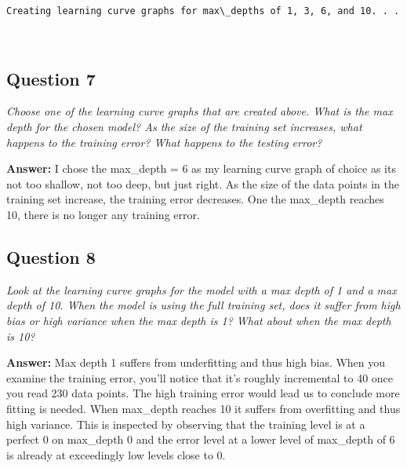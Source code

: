 \documentclass{article}
\begin{document}
    \begin{Verbatim}[commandchars=\\\{\}]
Creating learning curve graphs for max\_depths of 1, 3, 6, and 10. . .
    \end{Verbatim}

    \begin{center}
    \end{center}
    { \hspace*{\fill} \\}
    
    \subsection{Question 7}\label{question-7}

\emph{Choose one of the learning curve graphs that are created above.
What is the max depth for the chosen model? As the size of the training
set increases, what happens to the training error? What happens to the
testing error?}

    \textbf{Answer: } I chose the max\_depth = 6 as my learning curve graph
of choice as its not too shallow, not too deep, but just right. As the
size of the data points in the training set increase, the training error
decreases. One the max\_depth reaches 10, there is no longer any
training error.

    \subsection{Question 8}\label{question-8}

\emph{Look at the learning curve graphs for the model with a max depth
of 1 and a max depth of 10. When the model is using the full training
set, does it suffer from high bias or high variance when the max depth
is 1? What about when the max depth is 10?}

    \textbf{Answer: } Max depth 1 suffers from underfitting and thus high
bias. When you examine the training error, you'll notice that it's
roughly incremental to 40 once you read 230 data points. The high
training error would lead us to conclude more fitting is needed. When
max\_depth reaches 10 it suffers from overfitting and thus high
variance. This is inspected by observing that the training level is at a
perfect 0 on max\_depth 0 and the error level at a lower level of
max\_depth of 6 is already at exceedingly low levels close to 0.
\end{document}
